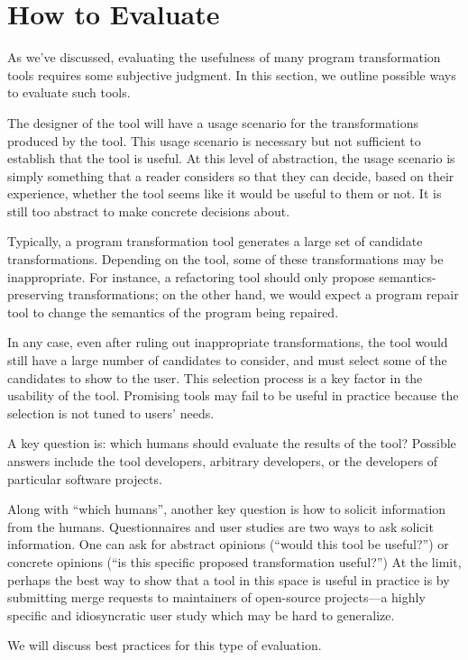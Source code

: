 \section{How to Evaluate}
As we've discussed, evaluating the usefulness of many program
transformation tools requires some subjective judgment. In this
section, we outline possible ways to evaluate such tools.

The designer of the tool will have a usage scenario for the 
transformations produced by the tool. This usage scenario is 
necessary but not sufficient to establish that the tool is useful.
At this level of abstraction, the usage scenario is simply something
that a reader considers so that they can decide, based on their experience, 
whether the tool seems like it would be useful to them or not. 
It is still too abstract to make concrete decisions about.

Typically, a program transformation tool generates a large set of
candidate transformations. Depending on the tool, some of these
transformations may be inappropriate. For instance, a refactoring
tool should only propose semantics-preserving transformations; on the
other hand, we would expect a program repair tool to change the semantics
of the program being repaired. 

In any case, even after ruling out 
inappropriate transformations, the tool would still have a large
number of candidates to consider, and must select some of the candidates to show
to the user. This selection process is a key factor in the usability of the tool.
Promising tools may fail to be useful in practice because the selection is not
tuned to users' needs.

A key question is: which humans should evaluate the results of the tool?
Possible answers include the tool developers, arbitrary developers, or the developers
of particular software projects.

Along with ``which humans'', another key question is how to solicit
information from the humans. Questionnaires and user studies are two
ways to ask solicit information. One can ask for abstract opinions
(``would this tool be useful?'') or concrete opinions (``is this
specific proposed transformation useful?'') At the limit, perhaps the
best way to show that a tool in this space is useful in practice is by
submitting merge requests to maintainers of open-source projects---a 
highly specific and idiosyncratic user study which may be hard to generalize.

We will discuss best practices for this type of evaluation.
